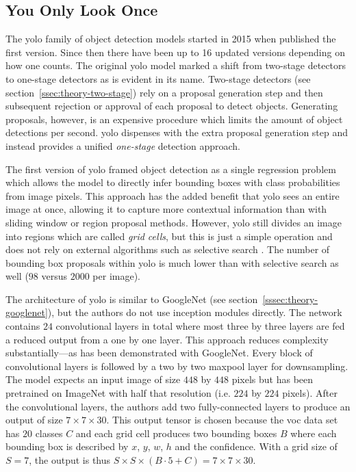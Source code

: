 \documentclass[final]{vutinfth} %
\begin{document}
\subsection{You Only Look Once}
\label{sec:methods-detection}

The \gls{yolo} family of object detection models started in 2015 when
\cite{redmon2016} published the first version. Since then there have
been up to 16 updated versions depending on how one counts. The
original \gls{yolo} model marked a shift from two-stage detectors to
one-stage detectors as is evident in its name. Two-stage detectors
(see section~\ref{ssec:theory-two-stage}) rely on a proposal
generation step and then subsequent rejection or approval of each
proposal to detect objects. Generating proposals, however, is an
expensive procedure which limits the amount of object detections per
second. \gls{yolo} dispenses with the extra proposal generation step
and instead provides a unified \emph{one-stage} detection approach.

The first version of \gls{yolo} \cite{redmon2016} framed object
detection as a single regression problem which allows the model to
directly infer bounding boxes with class probabilities from image
pixels. This approach has the added benefit that \gls{yolo} sees an
entire image at once, allowing it to capture more contextual
information than with sliding window or region proposal
methods. However, \gls{yolo} still divides an image into regions which
are called \emph{grid cells}, but this is just a simple operation and
does not rely on external algorithms such as selective search
\cite{uijlings2013}. The number of bounding box proposals within
\gls{yolo} is much lower than with selective search as well ($98$
versus $2000$ per image).

The architecture of \gls{yolo} is similar to GoogleNet (see
section~\ref{sssec:theory-googlenet}), but the authors do not use
inception modules directly. The network contains $24$ convolutional
layers in total where most three by three layers are fed a reduced
output from a one by one layer. This approach reduces complexity
substantially---as has been demonstrated with GoogleNet. Every block of
convolutional layers is followed by a two by two maxpool layer for
downsampling. The model expects an input image of size $448$ by $448$
pixels but has been pretrained on ImageNet with half that resolution
(i.e. $224$ by $224$ pixels). After the convolutional layers, the
authors add two fully-connected layers to produce an output of size
$7 \times 7 \times 30$. This output tensor is chosen because the \gls{voc} data
set has $20$ classes $C$ and each grid cell produces two bounding
boxes $B$ where each bounding box is described by $x$, $y$, $w$, $h$
and the confidence. With a grid size of $S = 7$, the output is thus
$S \times S \times (B \cdot 5 + C) = 7 \times 7 \times 30$.
\end{document}
